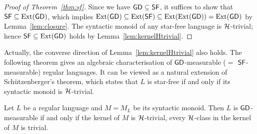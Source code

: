 \begin{proof}[Proof of Theorem~\ref{thm:sf}]
Since we have \(\gd \subseteq \sf\), it suffices to show that
\(\sf \subseteq \ext(\gd)\), which implies 
\(\ext(\gd) \subseteq \ext(\sf) \subseteq \ext(\ext(\gd)) = \ext(\gd)\) by Lemma~\ref{lem:closure}.
The syntactic monoid of any star-free language is \(\CH\)-trivial; hence \(\sf \subseteq \ext(\gd)\) holds by Lemma~\ref{lem:kernelHtrivial}.
\end{proof}

Actually, the converse direction of Lemma~\ref{lem:kernelHtrivial} also holds. The following theorem gives an algebraic characterisation of \(\gd\)-measurable (\(= \) \(\sf\)-measurable) regular languages.
It can be viewed as a natural extension of Sch\"utzenberger's theorem, which states that \(L\) is star-free if and only if its syntactic monoid is \(\CH\)-trivial.
\begin{theorem}[S.]\label{thm:algsf}
Let \(L\) be a regular language and \(M = M_L\) be its syntactic monoid.
Then \(L\) is \(\gd\)-measurable if and only if the kernel of \(M\) is \(\CH\)-trivial, \ie every \(\CH\)-class in the kernel of \(M\) is trivial.
\end{theorem}
